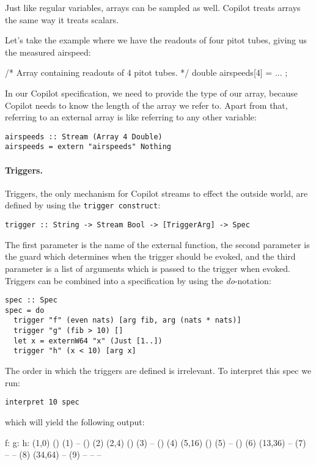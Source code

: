 Just like regular variables, arrays can be sampled as well. Copilot treats
arrays the same way it treats scalars. 
\begin{example}
\label{exmp:pitot}
Let's take the example where we
have the readouts of four pitot tubes, giving us the measured airspeed:
\begin{code}[frame=single]
/* Array containing readouts of 4 pitot tubes. */
double airspeeds[4] = ... ;
\end{code}
In our Copilot specification, we need to provide the type of our array, because
Copilot needs to know the length of the array we refer to. Apart from that,
referring to an external array is like referring to any other variable:
\begin{lstlisting}[language=Copilot, frame=single]
airspeeds :: Stream (Array 4 Double)
airspeeds = extern "airspeeds" Nothing
\end{lstlisting}
\end{example}


\paragraph{Triggers.}
Triggers, the only mechanism for Copilot streams to effect the outside world,
are defined by using the {\tt trigger construct}:
%
\begin{lstlisting}[language = Copilot, frame = single]
trigger :: String -> Stream Bool -> [TriggerArg] -> Spec
\end{lstlisting}
%
The first parameter is the name of the external function, the second parameter is the
guard which determines when the trigger should be evoked, and the third parameter
is a list of arguments which is passed to the trigger when evoked.
Triggers can be combined into a specification by using the \emph{do}-notation:
%
\begin{lstlisting}[language = Copilot, frame = single]
spec :: Spec
spec = do
  trigger "f" (even nats) [arg fib, arg (nats * nats)]
  trigger "g" (fib > 10) []
  let x = externW64 "x" (Just [1..])
  trigger "h" (x < 10) [arg x]
\end{lstlisting}
%
The order in which the triggers are defined is irrelevant. To interpret this spec we run:
%
\begin{lstlisting}[language = Copilot, frame = single]
interpret 10 spec
\end{lstlisting}
%
which will yield the following output:
%
\begin{code}
f:        g:	 h:
(1,0)     ()        (1)
--        ()        (2)
(2,4)     ()        (3)
--        ()        (4)
(5,16)    ()        (5)
--        ()        (6)
(13,36)   --	(7)
--        --        (8)
(34,64)   --	(9)
--        --         --
\end{code}
%


